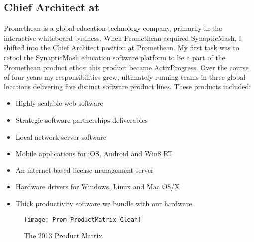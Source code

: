 \subsection{\textbf{Chief Architect} at  \shyears{[2010-2014]}}
Promethean is a global education technology company, primarily in the interactive whiteboard business.  When Promethean acquired SynapticMash, I shifted into the Chief Architect position at Promethean.  My first task was to retool the SynapticMash education software platform to be a part of the Promethean product ethos; this product became ActivProgress.  Over the course of four years my responsibilities grew, ultimately running teams in three global locations delivering five distinct software product lines.  These products included:
\begin{itemize}
\itemsep-0.5em
\item{Highly scalable web software}
\item{Strategic software partnerships deliverables}
\item{Local network server software}
\item{Mobile applications for iOS, Android and Win8 RT}
\item{An internet-based license management server}
\item{Hardware drivers for Windows, Linux and Mac OS/X}
\item{Thick productivity software we bundle with our hardware}
\end{itemize}

\begin{centering}
\begin{figure}%
  \texttt{[image: Prom-ProductMatrix-Clean]}
  \caption{The 2013 Product Matrix}
  \label{fig:PromSide}
\end{figure}
\end{centering}

